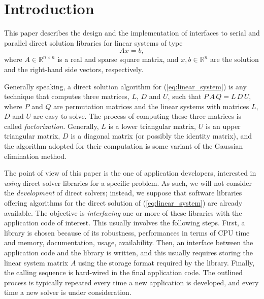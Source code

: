 \documentclass{llncs}
\begin{document}
\section{Introduction}
\label{sec:introduction}

This paper describes the design and the implementation of 
interfaces to serial and parallel direct solution libraries for
linear systems of type
\begin{equation}
  \label{eq:linear_system}
  A x = b,
\end{equation}
where $A \in \mathbb{R}^{n \times n}$ is a real and sparse square matrix, 
  and $x, b \in \mathbb{R}^{n}$ are the solution and
the right-hand side vectors, respectively. 

Generally speaking,
a direct solution algorithm for (\ref{eq:linear_system}) is any 
technique that computes three matrices, $L$, $D$ and $U$, such that
$P\, A\, Q = L \, D \, U$, where $P$ and $Q$ are permutation matrices
and the linear systems with matrices $L$, $D$ and $U$ are
easy to solve.
The process of computing these three matrices is called {\sl
  factorization}. Generally, $L$ is a lower triangular matrix, $U$ is an
upper triangular matrix, $D$ is a diagonal matrix 
(or possibly the identity matrix), and the algorithm adopted for their
computation is some variant of the Gaussian elimination method.

The point of view of this paper is the one of application developers, interested
in {\sl using} direct solver libraries for a specific problem. As such, we
will not consider the {\sl development} of direct solvers; instead, we suppose that software
libraries offering algorithms for the direct solution of
(\ref{eq:linear_system}) are already available. The objective is {\sl
interfacing} one or more of these libraries with the application code of
interest.  This usually involves the following steps. First, a library is chosen
because of its robustness, performances in terms of CPU time and memory,
documentation, usage, availability. Then, an interface between the application
code and the library is written, and this usually requires storing the linear
system matrix $A$ using the storage format required by the library. Finally, 
the calling sequence is hard-wired in the final application code.
The outlined process is typically repeated every time a new application is
developed, and every time a new solver is under consideration. 
\end{document}
